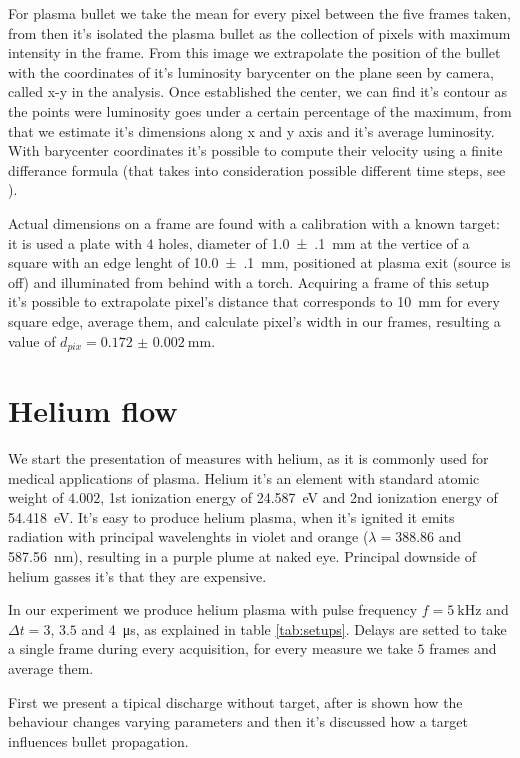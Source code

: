 For plasma bullet we take the mean for every pixel between the five frames taken, from then it's isolated the plasma bullet as the collection of pixels with maximum intensity in the frame. From this image we extrapolate the position of the bullet with the coordinates of it's luminosity barycenter on the plane seen by camera, called x-y in the analysis.
Once established the center, we can find it's contour as the points were luminosity goes under a certain percentage of the maximum, from that we estimate it's dimensions along x and y axis and it's average luminosity.
With barycenter coordinates it's possible to compute their velocity using a finite differance formula (that takes into consideration possible different time steps, see \cite{Bhadauria}).


Actual dimensions on a frame are found with a calibration with a known target: it is used a plate with $4$ holes, diameter of \SI{1.0(1)}{\milli\meter} at the vertice of a square with an edge lenght of \SI{10.0(1)}{\milli\meter}, positioned at plasma exit (source is off) and illuminated from behind with a torch.
Acquiring a frame of this setup it's possible to extrapolate pixel's distance that corresponds to \SI{10}{\milli\meter} for every square edge, average them, and calculate pixel's width in our frames, resulting a value of $d_{pix} = \SI{0.172(2)}{\milli\meter}$.

\section{Helium flow}
We start the presentation of measures with helium, as it is commonly used for medical applications of plasma.
Helium it's an element with standard atomic weight of $\num{4.002}$, 1st ionization energy of \SI{24.587}{\electronvolt} and 2nd ionization energy of \SI{54.418}{\electronvolt}.
It's easy to produce helium plasma, when it's ignited it emits radiation with principal wavelenghts in violet and orange ($\lambda = \num{388.86}$ and \SI{587.56}{\nano\meter}), resulting in a purple plume at naked eye.
Principal downside of helium gasses it's that they are expensive.


In our experiment we produce helium plasma with pulse frequency $f = \SI{5}{\kilo\hertz}$ and $\Delta t = \num{3}$, $\num{3.5}$ and \SI{4}{\micro\second}, as explained in table \ref{tab:setups}.
Delays are setted to take a single frame during every acquisition, for every measure we take $5$ frames and average them.


First we present a tipical discharge without target, after is shown how the behaviour changes varying parameters and then it's discussed how a target influences bullet propagation.

